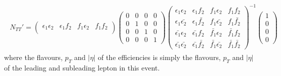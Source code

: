 \begin{align}
\begin{split}
N_{TT}'
=
\left( \begin{array}{cccc}
\epsilon_1 \epsilon_2 & \epsilon_1 f_2 & f_1 \epsilon_2 & f_1 f_2 \\
\end{array} \right)
\left( \begin{array}{cccc}
0 & 0 & 0 & 0 \\
0 & 1 & 0 & 0 \\
0 & 0 & 1 & 0 \\
0 & 0 & 0 & 1
\end{array} \right)
\left( \begin{array}{cccc}
\epsilon_1 \epsilon_2 & \epsilon_1 f_2 & f_1 \epsilon_2 & f_1 f_2 \\
\epsilon_1 \bar{\epsilon_2} & \epsilon_1 \bar{f_2} & f_1 \bar{\epsilon_2} & f_1 \bar{f_2} \\
\bar{\epsilon_1} \epsilon_2 & \bar{\epsilon_1} f_2 & \bar{f_1} \epsilon_2 & \bar{f_1} f_2 \\
\bar{\epsilon_1} \bar{\epsilon_2} & \bar{\epsilon_1} \bar{f_2} & \bar{f_1} \bar{\epsilon_2} & \bar{f_1} \bar{f_2}
\end{array} \right)^{-1}
\left( \begin{array}{c}
1 \\
0 \\
0 \\
0
\end{array} \right)
\end{split}
\label{equ:fake_eff_fake_weight}
\end{align}
where the flavours, $p_T$ and $|\eta|$ of the efficiencies is simply the flavours, $p_T$ and $|\eta|$ of the leading and subleading lepton in this event.

